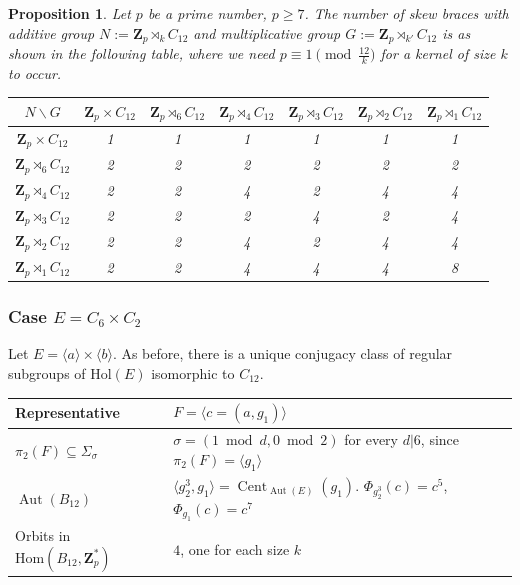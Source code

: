 \documentclass[12pt]{article}
\newtheorem{proposition}[theorem]{Proposition}
\theoremstyle{definition}
\newcommand{\Z}{\mathbf Z}
\newcommand{\Hol}{\mathrm{Hol}}
\newcommand{\Hom}{\mathrm{Hom}}
\newcommand{\Aut}{\operatorname{Aut}}
\begin{document}
	
	\begin{proposition}
		Let $p$ be a prime number, $p\geq 7$. The number of skew braces with additive group $N:=\Z_p \rtimes_k C_{12}$ and multiplicative group
		$G:=\Z_p\rtimes_{k'} C_{12}$ is as shown in the following table, where we need $p\equiv 1 \pmod{\frac {12}k}$ for a kernel of size $k$ to occur.
		
		\begin{center}
			
			\begin{tabular}{|c||c|c|c|c|c|c|}
				\hline
				$N \backslash G$ & $\Z_p\times C_{12}$ & $\Z_p\rtimes_{6} C_{12}$ & $\Z_p\rtimes_{4} C_{12}$ & $\Z_p\rtimes_{3} C_{12}$ & $\Z_p\rtimes_{2} C_{12}$& $\Z_p\rtimes_{1} C_{12}$\\
				\hline
				\hline
				$\Z_p \times C_{12}$ &1&1&1&1 &1&1\\
				\hline
				$\Z_p \rtimes_{6} C_{12}$ &2&2&2 &2 &2 &2\\
				\hline
				$\Z_p \rtimes_{4} C_{12}$ &2&2& 4 &2  &4 &4\\
				\hline
				$\Z_p \rtimes_{3} C_{12}$ &2& 2 & 2&4 &2 &4 \\
				\hline
				$\Z_p \rtimes_{2} C_{12}$ &2&2& 4 &2 &4&4\\
				\hline
				$\Z_p \rtimes_{1} C_{12}$ &2& 2& 4&4 &4 & 8 \\
				\hline
				
			\end{tabular}
		\end{center}
		
	\end{proposition}
	
	
	\subsubsection*{Case $E=C_{6}\times C_2$}
    
    Let $E=\langle a\rangle \times \langle b\rangle$.  As before, there is a unique conjugacy class of regular subgroups of $\Hol(E)$ isomorphic to $C_{12}$.
	

\begin{center}
    \begin{tabular}{|l|l|}
    \hline
      Representative& $F=\langle c=(a,g_1)\rangle$ \\
      \hline
      $\pi_2(F)\subseteq \Sigma_{\sigma}$ &  $\sigma=(1 \bmod d,0\bmod 2)$ for every $d|6$, since $\pi_2(F)=\langle g_1\rangle$ \\
      $\Aut(B_{12})$ & $\langle g_2^3,g_1\rangle=\operatorname{Cent}_{\Aut(E)}(g_1)$.\quad  
      $\Phi_{g_2^3}(c)=c^5$, $\Phi_{g_1}(c)=c^7$ \\
      Orbits in $\Hom(B_{12},\Z_p^*)$ & $4$, one for each size $k$\\
      \hline
    \end{tabular}
\end{center}    
    
\end{document}
